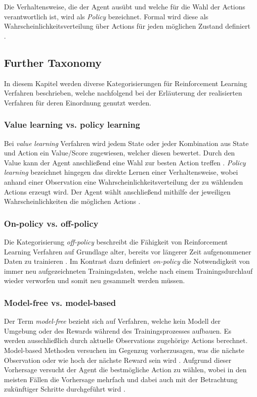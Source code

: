 \documentclass[11pt]{scrartcl}
\begin{document}
Die Verhaltensweise, die der Agent ausübt und welche für die Wahl der Actions verantwortlich ist,
wird als \textit{Policy} bezeichnet. Formal wird diese als Wahrscheinlichkeitsverteilung
über Actions für jeden möglichen Zustand definiert \cite[~S.22 f.]{L2018}. 

\subsection{Further Taxonomy} %
In diesem Kapitel werden diverse Kategorisierungen für Reinforcement Learning Verfahren beschrieben,
welche nachfolgend bei der Erläuterung der realisierten Verfahren für deren Einordnung genutzt werden.  


\subsubsection{Value learning vs. policy learning}
Bei \textit{value learning} Verfahren wird jedem State oder jeder Kombination aus State und Action ein
Value/Score zugewiesen, welcher diesen bewertet. Durch den Value kann der Agent anschließend eine
Wahl zur besten Action treffen \cite[~S.NA]{L2018}. \textit{Policy learning} bezeichnet hingegen das
direkte Lernen einer Verhaltensweise, wobei anhand einer Observation eine Wahrscheinlichkeitsverteilung
der zu wählenden Actions erzeugt wird. Der Agent wählt anschließend mithilfe der jeweiligen
Wahrscheinlichkeiten die möglichen Actions \cite[~S.NA]{L2018}.


\subsubsection{On-policy vs. off-policy}
Die Kategorisierung \textit{off-policy} beschreibt die Fähigkeit von Reinforcement Learning Verfahren auf
Grundlage alter, bereits vor längerer Zeit aufgenommener Daten zu trainieren \cite[~S.NA]{L2018}. 
Im Kontrast dazu definiert \textit{on-policy} die Notwendigkeit von immer neu aufgezeichneten 
Trainingsdaten, welche nach einem Trainingsdurchlauf wieder verworfen und somit neu gesammelt
werden müssen.


\subsubsection{Model-free vs. model-based}
Der Term \textit{model-free} bezieht sich auf Verfahren, welche kein Modell der Umgebung oder des Rewards
während des Trainingsprozesses aufbauen. Es werden ausschließlich durch aktuelle Observations
zugehörige Actions berechnet. Model-based Methoden versuchen im Gegenzug vorherzusagen, was 
die nächste Observation oder wie hoch der nächste Reward sein wird \cite[~S.NA]{L2018}. Aufgrund dieser
Vorhersage versucht der Agent die bestmögliche Action zu wählen, wobei in den meisten
Fällen die Vorhersage mehrfach und dabei auch mit der Betrachtung zukünftiger Schritte durchgeführt
wird \cite[~S.NA]{L2018}.
\end{document}
